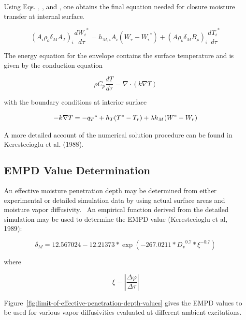 Using Eqs. , , and , one obtains the final equation needed for closure moisture transfer at internal surface.

\begin{equation}
{({A_i}{\rho_b}{\delta_M}{A_T})_i}\frac{{d{W_i}^*}}{{d\tau }} = {h_{M,i}}{A_i}({W_r} - {W_i}^*) + {(A{\rho_b}{\delta_M}{B_\rho })_i}\frac{{d{T_i}^*}}{{d\tau }}
\end{equation}

The energy equation for the envelope contains the surface temperature and is given by the conduction equation

\begin{equation}
\rho {C_p}\frac{{dT}}{{d\tau }} = \nabla  \cdot (k\nabla T)
\end{equation}

with the boundary conditions at interior surface

\begin{equation}
- k\nabla T =  - {q_T}`` + {h_T}({T^*} - {T_r}) + \lambda {h_M}({W^*} - {W_r})
\end{equation}

A more detailed account of the numerical solution procedure can be found in Kerestecioglu et al. (1988).

\subsection{EMPD Value Determination}\label{empd-value-determination}

An effective moisture penetration depth may be determined from either experimental or detailed simulation data by using actual surface areas and moisture vapor diffusivity.~ An empirical function derived from the detailed simulation may be used to determine the EMPD value (Kerestecioglu et al, 1989):

\begin{equation}
{\delta_M} = 12.567024 - 12.21373*\exp \left( { - 267.0211*{D_v}^{0.7}*{\xi ^{ - 0.7}}} \right)
\end{equation}

where

\begin{equation}
\xi  = \left| {\frac{{\Delta \varphi }}{{\Delta \tau }}} \right|
\end{equation}

Figure~\ref{fig:limit-of-effective-penetration-depth-values} gives the EMPD values to be used for various vapor diffusivities evaluated at different ambient excitations.

